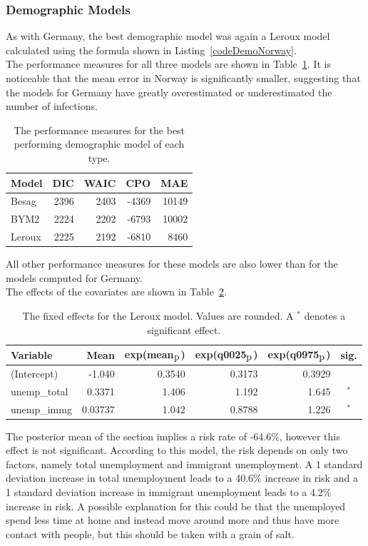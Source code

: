 \subsubsection{Demographic Models}
As with Germany, the best demographic model was again a Leroux model calculated using the formula shown in Listing~\ref{codeDemoNorway}. \\
The performance measures for all three models are shown in Table~\ref{demoNorway}. It is noticeable that the mean error in Norway is significantly smaller, suggesting that the models for Germany have greatly overestimated or underestimated the number of infections.
\begin{table}[H] 
\caption{The performance measures for the best performing demographic model of each type. \label{demoNorway}}
\begin{tabular}{l r r r r}
\toprule
\textbf{Model}	& \textbf{DIC}	& \textbf{WAIC} & \textbf{CPO} & \textbf{MAE}\\
\midrule
Besag  & 2396 & 2403 & -4369 & 10149 \\
BYM2 & 2224 & 2202 & -6793 & 10002\\
Leroux & 2225  & 2192 & -6810 & 8460\\
\bottomrule
\end{tabular}
\end{table}
All other performance measures for these models are also lower than for the models computed for Germany. \\
The effects of the covariates are shown in Table~\ref{fixedDemoNorway}.
\begin{table}[H] 
\caption{The fixed effects for the Leroux model. Values are rounded. A $^*$ denotes a significant effect.\label{fixedDemoNorway}}
\begin{tabular}{l r r r r c}
\toprule
\textbf{Variable}	& \textbf{Mean}	& \textbf{exp(mean$_{\hbox{p}}$)} & \textbf{exp(q0025$_{\hbox{p}}$)} & \textbf{exp(q0975$_{\hbox{p}}$)} & \textbf{sig.}\\
\midrule
(Intercept) & -1.040 & 0.3540 & 0.3173 & 0.3929 & \\
unemp\_total & 0.3371 & 1.406 & 1.192 & 1.645 & $^*$\\
unemp\_immg & 0.03737 & 1.042 & 0.8788 & 1.226 & $^*$\\
\bottomrule
\end{tabular}
\end{table}
The posterior mean of the section implies a risk rate of -64.6\%, however this effect is not significant. According to this model, the risk depends on only two factors, namely total unemployment and immigrant unemployment. A 1 standard deviation increase in total unemployment leads to a 40.6\% increase in risk and a 1 standard deviation increase in immigrant unemployment leads to a 4.2\% increase in risk. A possible explanation for this could be that the unemployed spend less time at home and instead move around more and thus have more contact with people, but this should be taken with a grain of salt.
